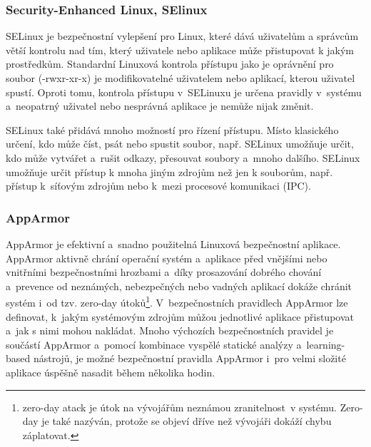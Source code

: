 \documentclass[a4paper,12pt]{article}
\begin{document}
\subsubsection{Security-Enhanced Linux, SElinux}

SELinux je bezpečnostní vylepšení pro Linux, které dává uživatelům a správcům větší kontrolu nad tím, který uživatele nebo aplikace může přistupovat k jakým prostředkům. Standardní Linuxová kontrola přístupu jako je oprávnění pro soubor (-rwxr-xr-x) je modifikovatelné uživatelem nebo aplikací, kterou uživatel spustí. Oproti tomu, kontrola přístupu v~SELinuxu je určena pravidly v~systému a~neopatrný uživatel nebo nesprávná aplikace je nemůže nijak změnit.

SELinux také přidává mnoho možností pro řízení přístupu. Místo klasického určení, kdo může číst, psát nebo spustit soubor, např. SELinux umožňuje určit, kdo může vytvářet a~rušit odkazy, přesouvat soubory a~mnoho dalšího. SELinux umožňuje určit přístup k mnoha jiným zdrojům než jen k souborům, např. přístup k~síťovým zdrojům nebo k~mezi procesové komunikaci (IPC).\cite{SElinuxWiki}


\subsubsection{AppArmor}

AppArmor je efektivní a~snadno použitelná Linuxová bezpečnostní aplikace. AppArmor aktivně chrání operační systém a~aplikace před vnějšími nebo vnitřními bezpečnostními hrozbami a~díky prosazování dobrého chování a~prevence od neznámých, nebezpečných nebo vadných aplikací dokáže chránit systém i~od tzv. zero-day útoků\footnote{zero-day atack je útok na vývojářům neznámou zranitelnost~v systému. Zero-day je také nazýván, protože se objeví dříve než vývojáři dokáží chybu záplatovat.}. V~bezpečnostních pravidlech AppArmor lze definovat, k~jakým systémovým zdrojům můžou jednotlivé aplikace přistupovat a~jak s nimi mohou nakládat. Mnoho výchozích bezpečnostních pravidel je součástí AppArmor a~pomocí kombinace vyspělé statické analýzy a~learning-based nástrojů, je možné bezpečnostní pravidla AppArmor i~pro velmi složité aplikace úspěšně nasadit během několika hodin.\cite{AppArmorWikiMain}
\end{document}
